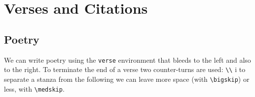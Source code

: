 \documentclass[a4paper,
                             twoside,
                             BCOR=1.0cm,
                             DIV=11,
                             parskip=full,
                             11pt]{scrbook}
\begin{document}
\section{Verses and Citations}\label{sec:quote}
\subsection{Poetry}\label{sbsec:poetry}

We can write poetry using the \verb+verse+ environment that bleeds to the left and also to the right. To terminate the end of a verse two counter-turns are used: \verb+\\+ i to separate a stanza from the following we can leave more space (with \verb+\bigskip+) or less, with \verb+\medskip+.
\end{document}
